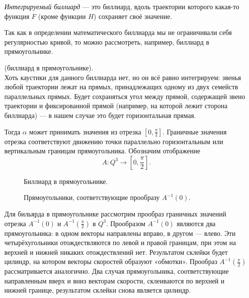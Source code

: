 \begin{definition}
    \textit{Интегрируемый биллиард} — это биллиард, вдоль траектории которого какая-то функция $F$ (кроме функции $H$) сохраняет своё значение.
\end{definition} 

Так как в определении математического биллиарда мы не ограничивали себя регулярностью кривой, то можно рассмотреть, например, биллиард в прямоугольнике.
\begin{example}(биллиард в прямоугольнике).\\
    Хоть каустики для данного биллиарда нет, но он всё равно интегрируем: звенья любой траектории лежат на прямых, принадлежащих одному из двух семейств параллельных прямых. Будет сохраняться угол между прямой, содержащей звено траектории и фиксированной прямой (например, на которой лежит сторона биллиарда) — в нашем случае это будет горизонтальная прямая.

    Тогда $\alpha$ может принимать значения из отрезка $[0, \frac{\pi}{2}]$. Граничные значения отрезка соответствуют движению точки параллельно горизонтальным или вертикальным границам прямоугольника. Обозначим отображение
    \[A: Q^3 \to \left[0, \frac{\pi}{2}\right].\]

    \begin{figure}[ht]
        \centering
        \caption{Биллиард в прямоугольнике.}
        \label{fig:c15.4}
    \end{figure}

    \begin{figure}[ht]
        \centering
        \caption{Прямоугольники, соответствующие прообразу $A^{-1}(0).$}
        \label{fig:c15.5}
    \end{figure}

    Для бильярда в прямоугольнике рассмотрим прообраз граничных значений отрезка $A^{-1}(0)$ и $A^{-1}(\frac{\pi}{2})$ в $Q^3$. Прообразом $A^{-1}(0)$ являются два прямоугольника: в одном векторы направлены вправо, в другом — влево. Эти четырёхугольники отождествляются по левой и правой границам, при этом на верхней и нижней никаких отождествлений нет. Результатом склейки будет цилиндр, на котором векторы скоростей образуют «обмотки». Прообраз $A^{-1}(\frac{\pi}{2})$ рассматривается аналогично. Два случая прямоугольника, соответствующие направленным вверх и вниз векторам скорости, склеиваются по верхней и нижней границе, результатом склейки снова является цилиндр.


\end{example}
